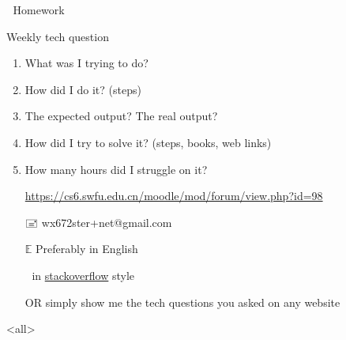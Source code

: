 \begin{frame}{{  \enspace}Homework}
  \begin{block}{Weekly tech question}
    \begin{enumerate}
    \item What was I trying to do?
    \item How did I do it? (steps)
    \item The expected output? The real output?
    \item How did I try to solve it? (steps, books, web links)
    \item How many hours did I struggle on it?
    \end{enumerate}
  \end{block}
  \begin{itemize}
  \item[\moodle] \url{https://cs6.swfu.edu.cn/moodle/mod/forum/view.php?id=98}
  \item[🖃] \alert{\ttfamily wx672ster+net@gmail.com}
  \item[$\mathbb{E}$] Preferably in English
  \item[] in
    \href{https://stackoverflow.com/questions/39199299/what-is-the-essential-difference-between-compound-command-and-normal-command-inlink}{stackoverflow}
    style
  \item[OR] simply show me the tech questions you asked on any website
  \end{itemize}  
\end{frame}

\mode<all>
